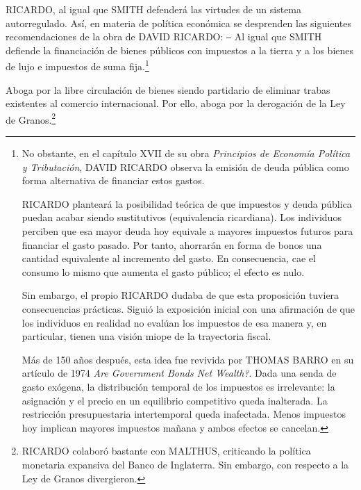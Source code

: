 \documentclass[10pt,a4paper]{article}
\begin{document}
RICARDO, al igual que SMITH defenderá las virtudes de un sistema autorregulado. Así, en materia de política económica se desprenden las siguientes recomendaciones de la obra de DAVID RICARDO:
‒
Al igual que SMITH defiende la financiación de bienes públicos con impuestos a la tierra y a los bienes de lujo e impuestos de suma fija.\footnote{%
    No obstante, en el capítulo XVII de su obra \textit{Principios de Economía Política y Tributación}, DAVID RICARDO observa la emisión de deuda pública como forma alternativa de financiar estos gastos.

RICARDO planteará la posibilidad teórica de que impuestos y deuda pública puedan acabar siendo sustitutivos (equivalencia ricardiana). Los individuos perciben que esa mayor deuda hoy equivale a mayores impuestos futuros para financiar el gasto pasado. Por tanto, ahorrarán en forma de bonos una cantidad equivalente al incremento del gasto. En consecuencia, cae el consumo lo mismo que aumenta el gasto público; el efecto es nulo.

Sin embargo, el propio RICARDO dudaba de que esta proposición tuviera consecuencias prácticas. Siguió la exposición inicial con una afirmación de que los individuos en realidad no evalúan los impuestos de esa manera y, en particular, tienen una visión miope de la trayectoria fiscal.

Más de 150 años después, esta idea fue revivida por THOMAS BARRO en su artículo de 1974 \textit{Are Government Bonds Net Wealth?}. Dada una senda de gasto exógena, la distribución temporal de los impuestos es irrelevante: la asignación y el precio en un equilibrio competitivo queda inalterada. La restricción presupuestaria intertemporal queda inafectada. Menos impuestos hoy implican mayores impuestos mañana y ambos efectos se cancelan.
}

Aboga por la libre circulación de bienes siendo partidario de eliminar trabas existentes al comercio internacional. Por ello, aboga por la derogación de la Ley de Granos.\footnote{%
    RICARDO colaboró bastante con MALTHUS, criticando la política monetaria expansiva del Banco de Inglaterra. Sin embargo, con respecto a la Ley de Granos divergieron.
}
\end{document}
